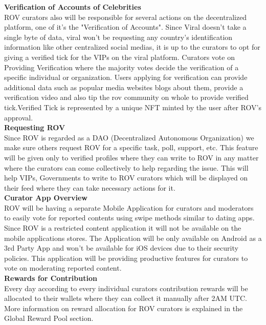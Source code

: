 \documentclass[conference]{IEEEtran}
\begin{document}
\textbf{Verification of Accounts of Celebrities}\\

ROV curators also will be responsible for several actions on the decentralized platform, one of it's the "Verification of Accounts". Since Viral doesn’t take a single byte of data, viral won’t be requesting any country’s identification information like other centralized social medias, it is up to the curators to opt for giving a verified tick for the VIPs on the viral platform. Curators vote on Providing Verification where the majority votes decide the verification of a specific individual or organization. Users applying for verification can provide additional data such as popular media websites blogs about them, provide a verification video and also tip the rov community on whole to provide verified tick.Verified Tick is represented by a unique NFT minted by the user after ROV's approval.\\

\textbf{Requesting ROV}\\

Since ROV is regarded as a DAO (Decentralized Autonomous Organization) we make sure others request ROV for a specific task, poll, support, etc. This feature will be given only to verified profiles where they can write to ROV in any matter where the curators can come collectively to help regarding the issue. This will help VIPs, Governments to write to ROV curators which will be displayed on their feed where they can take necessary actions for it. \\

\textbf{Curator App Overview}\\

ROV will be having a separate Mobile Application for curators and moderators to easily vote for reported contents using swipe methods similar to dating apps. Since ROV is a restricted content application it will not be available on the mobile applications stores. The Application will be only available on Android as a 3rd Party App and won’t be available for iOS devices due to their security policies. This application will be providing productive features for curators to vote on moderating reported content. \\


\textbf{Rewards for Contribution}\\

Every day according to every individual curators contribution rewards will be allocated to their wallets where they can collect it manually after 2AM UTC.  More information on reward allocation for ROV curators is explained in the Global Reward Pool section.\\
\end{document}
